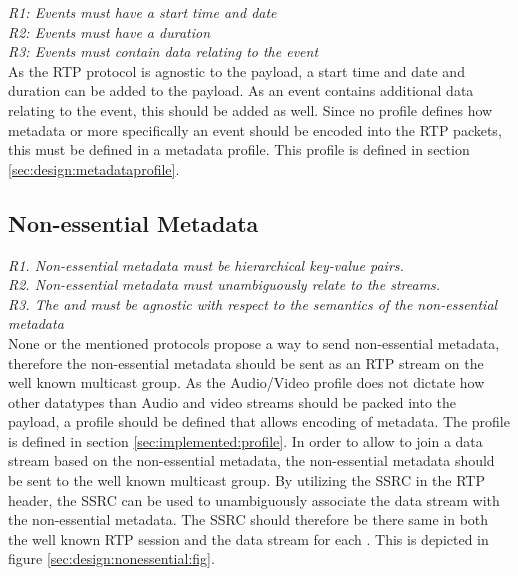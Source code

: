 \noindent \textit{R1: Events must have a start time and date}\\
\textit{R2: Events must have a duration}\\
\textit{R3: Events must contain data relating to the event} \\

\noindent As the RTP protocol is agnostic to the payload, a start time and date and duration can be added to the payload. As an event contains additional data relating to the event, this should be added as well. Since no profile defines how metadata or more specifically an event should be encoded into the RTP packets, this must be defined in a metadata profile. This profile is defined in section \ref{sec:design:metadataprofile}.


\subsection{Non-essential Metadata} \label{sec:design:nonessential}
\textit{R1. Non-essential metadata must be hierarchical key-value pairs.} \\
\textit{R2. Non-essential metadata must unambiguously relate to the streams.} \\
\textit{R3. The \pub{} and \sub{} must be agnostic with respect to the semantics of the non-essential metadata} \\
None or the mentioned protocols propose a way to send non-essential metadata, therefore the non-essential metadata should be sent as an RTP stream on the well known multicast group. As the Audio/Video profile does not dictate how other datatypes than Audio and video streams should be packed into the payload, a profile should be defined that allows encoding of metadata. The profile is defined in section \ref{sec:implemented:profile}. In order to allow \subs{} to join a data stream based on the non-essential metadata, the non-essential metadata should be sent to the well known multicast group. By utilizing the SSRC in the RTP header, the SSRC can be used to unambiguously associate the data stream with the non-essential metadata. The SSRC should therefore be there same in both the well known RTP session and the data stream for each \pub{}. This is depicted in figure \ref{sec:design:nonessential:fig}.

